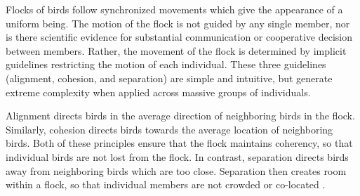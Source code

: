 Flocks of birds follow synchronized movements which give the
appearance of a uniform being. The motion of the flock is not guided
by any single member, nor is there scientific evidence for substantial
communication or cooperative decision between members.  Rather, the
movement of the flock is determined by implicit guidelines restricting
the motion of each individual. These three guidelines (alignment,
cohesion, and separation) are simple and intuitive, but generate
extreme complexity when applied across massive groups of individuals.

Alignment directs birds in the average direction of neighboring birds
in the flock. Similarly, cohesion directs birds towards the average
location of neighboring birds. Both of these principles ensure that
the flock maintains coherency, so that individual birds are not lost
from the flock. In contrast, separation directs birds away from
neighboring birds which are too close. Separation then creates room
within a flock, so that individual members are not crowded or
co-located \cite{Reynolds}.
